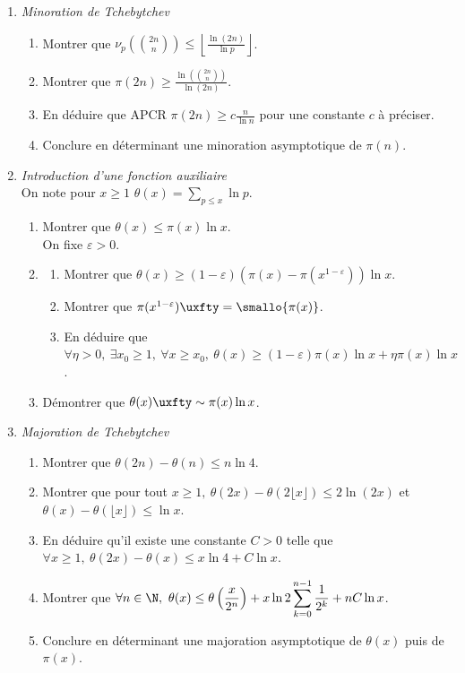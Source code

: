 \documentclass[8pt]{book}
\begin{document}
\begin{enumerate}
	\item \textit{Minoration de Tchebytchev}
	\begin{enumerate}[label=\alph*.]
		\item Montrer que $\displaystyle \nu_p\left(\binom{2n}{n}\right)\leq \left\lfloor\frac{\ln(2n)}{\ln p}\right\rfloor$.
		\item Montrer que $\pi(2n)\geq \displaystyle\frac{\ln\left(\binom{2n}{n}\right)}{\ln(2n)}$.
		\item En déduire que APCR $\pi(2n)\geq \displaystyle c\frac{n}{\ln n}$ pour une constante $c$ à préciser.
		\item Conclure en déterminant une minoration asymptotique de $\pi(n)$.
	\end{enumerate}
	\item \textit{Introduction d'une fonction auxiliaire}\\
	On note pour $x\geq 1$ $\theta(x)=\displaystyle\sum_{p\leq x}\ln p$.
	\begin{enumerate}[label=\alph*.]
		\item Montrer que $\theta(x)\leq \pi(x)\ln x$.\\
		On fixe $\varepsilon>0$.
		\item
		\begin{enumerate}[label=\roman*.]
			\item Montrer que $\theta(x)\geq (1-\varepsilon)\left(\pi(x)-\pi(x^{1-\varepsilon})\right)\ln x$.
			\item Montrer que $\pi(x^{1-\varepsilon})\uxfty=\smallo{\pi(x)}$.
			\item En déduire que $\forall \eta>0,\ \exists x_0\geq 1,\ \forall x\geq x_0,\ \theta(x)\geq (1-\varepsilon)\pi(x)\ln x+\eta\pi(x)\ln x$.
		\end{enumerate}
		\item Démontrer que $\theta(x)\uxfty\sim\pi(x)\ln x$.
	\end{enumerate}
	\item \textit{Majoration de Tchebytchev}
	\begin{enumerate}[label=\alph*.]
		\item Montrer que $\theta(2n)-\theta(n)\leq n\ln 4$.
		\item Montrer que pour tout $x\geq 1,\ \theta(2x)-\theta(2\lfloor x\rfloor)\leq 2\ln(2x)$ et $\theta(x)-\theta(\lfloor x\rfloor)\leq \ln x$.
		\item En déduire qu'il existe une constante $C>0$ telle que $\forall x\geq 1,\ \theta(2x)-\theta(x)\leq x\ln 4+C\ln x$.
		\item Montrer que $\forall n\in \N,\ \theta(x)\leq \displaystyle \theta\left(\frac{x}{2^n}\right)+x\ln 2\sum_{k=0}^{n-1}\frac{1}{2^k}+nC\ln x$.
		\item Conclure en déterminant une majoration asymptotique de $\theta(x)$ puis de $\pi(x)$.
	\end{enumerate}
\end{enumerate}
\end{document}
